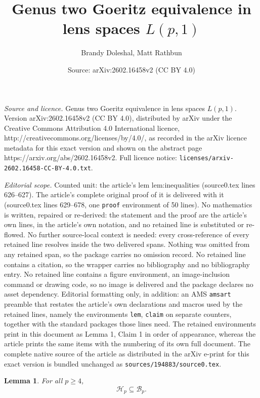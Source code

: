 \documentclass[10pt,a4paper]{amsart}
\title{Genus two Goeritz equivalence in lens spaces $L(p, 1)$}
\author{Brandy Doleshal, Matt Rathbun}
\date{Source: arXiv:2602.16458v2 (CC BY 4.0)}
\newtheorem{lem}{Lemma}
\begin{document}
\maketitle

\noindent\emph{Source and licence.} Genus two Goeritz equivalence in lens spaces $L(p, 1)$. Version arXiv:2602.16458v2 (CC BY 4.0), distributed by arXiv under the Creative Commons Attribution 4.0 International licence, http://creativecommons.org/licenses/by/4.0/, as recorded in the arXiv licence metadata for this exact version and shown on the abstract page https://arxiv.org/abs/2602.16458v2. Full licence notice: \texttt{licenses/arxiv-2602.16458-CC-BY-4.0.txt}.\par\smallskip

\noindent\textit{Editorial scope.} Counted unit: the article's lem lem:inequalities (source0.tex lines 626--627). The article's complete original proof of it is delivered with it (source0.tex lines 629--678, one \texttt{proof} environment of 50 lines). No mathematics is written, repaired or re-derived: the statement and the proof are the article's own lines, in the article's own notation, and no retained line is substituted or re-flowed.  No further source-local context is needed: every cross-reference of every retained line resolves inside the two delivered spans.  Nothing was omitted from any retained span, so the package carries no omission record.  No retained line contains a citation, so the wrapper carries no bibliography and no bibliography entry.  No retained line contains a figure environment, an image-inclusion command or drawing code, so no image is delivered and the package declares no asset dependency.  Editorial formatting only, in addition: an AMS \texttt{amsart} preamble that restates the article's own declarations and macros used by the retained lines, namely the environments \texttt{lem}, \texttt{claim} on separate counters, together with the standard packages those lines need.  The retained environments print in this document as Lemma 1, Claim 1 in order of appearance, whereas the article prints the same items with the numbering of its own full document.  The complete native source of the article as distributed in the arXiv e-print for this exact version is bundled unchanged as \texttt{sources/194883/source0.tex}.
\begin{lem} \label{lem:inequalities} For all $p \geq 4$,  \[\mathcal{H}_p \subseteq  \mathcal{B}_p .\]
\end{lem} 
\end{document}
